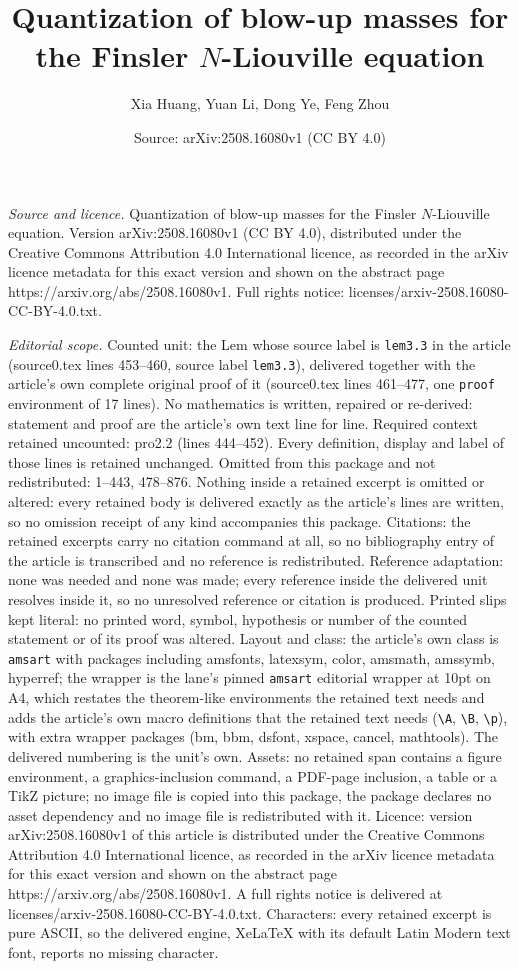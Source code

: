 \documentclass[10pt,a4paper]{amsart}
\title[Quantization of blow-up masses for the Finsler $N$-Liouville]{Quantization of blow-up masses for the Finsler $N$-Liouville equation}
\author{Xia Huang, Yuan Li, Dong Ye, Feng Zhou}
\date{Source: arXiv:2508.16080v1 (CC BY 4.0)}
\begin{document}
\maketitle

\noindent\emph{Source and licence.} Quantization of blow-up masses for the Finsler $N$-Liouville equation. Version arXiv:2508.16080v1 (CC BY 4.0), distributed under the Creative Commons Attribution 4.0 International licence, as recorded in the arXiv licence metadata for this exact version and shown on the abstract page https://arxiv.org/abs/2508.16080v1. Full rights notice: licenses/arxiv-2508.16080-CC-BY-4.0.txt.\par\smallskip

\noindent\textit{Editorial scope.} Counted unit: the Lem whose source label is \texttt{lem3.3} in the article (source0.tex lines 453--460, source label \texttt{lem3.3}), delivered together with the article's own complete original proof of it (source0.tex lines 461--477, one \texttt{proof} environment of 17 lines). No mathematics is written, repaired or re-derived: statement and proof are the article's own text line for line. Required context retained uncounted: pro2.2 (lines 444--452). Every definition, display and label of those lines is retained unchanged. Omitted from this package and not redistributed: 1--443, 478--876. Nothing inside a retained excerpt is omitted or altered: every retained body is delivered exactly as the article's lines are written, so no omission receipt of any kind accompanies this package. Citations: the retained excerpts carry no citation command at all, so no bibliography entry of the article is transcribed and no reference is redistributed. Reference adaptation: none was needed and none was made; every reference inside the delivered unit resolves inside it, so no unresolved reference or citation is produced. Printed slips kept literal: no printed word, symbol, hypothesis or number of the counted statement or of its proof was altered. Layout and class: the article's own class is \texttt{amsart} with packages including amsfonts, latexsym, color, amsmath, amssymb, hyperref; the wrapper is the lane's pinned \texttt{amsart} editorial wrapper at 10pt on A4, which restates the theorem-like environments the retained text needs and adds the article's own macro definitions that the retained text needs (\texttt{\textbackslash A}, \texttt{\textbackslash B}, \texttt{\textbackslash p}), with extra wrapper packages (bm, bbm, dsfont, xspace, cancel, mathtools). The delivered numbering is the unit's own. Assets: no retained span contains a figure environment, a graphics-inclusion command, a PDF-page inclusion, a table or a TikZ picture; no image file is copied into this package, the package declares no asset dependency and no image file is redistributed with it. Licence: version arXiv:2508.16080v1 of this article is distributed under the Creative Commons Attribution 4.0 International licence, as recorded in the arXiv licence metadata for this exact version and shown on the abstract page https://arxiv.org/abs/2508.16080v1. A full rights notice is delivered at licenses/arxiv-2508.16080-CC-BY-4.0.txt. Characters: every retained excerpt is pure ASCII, so the delivered engine, XeLaTeX with its default Latin Modern text font, reports no missing character.
\end{document}
